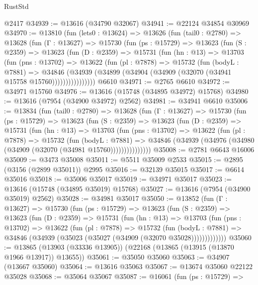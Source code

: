 \begin{lexlean}{RustStd}
\begin{coremodule}
    @2417
@34939 := @13616 (@34790 @32067)
@34941 := @22124 @34854 @30969
@34970 := @13810
    (fun (lets0 : @13624) =>
    @13626
      (fun (tail0 : @2780) =>
      @13628
        (fun (Γ : @13627) =>
        @15730
          (fun (ps : @15729) =>
          @13623
            (fun (S : @2359) =>
            @13623
              (fun (D : @2359) =>
              @15731
                (fun (hn : @13) =>
                @13703
                  (fun (pns : @13702) =>
                  @13622
                    (fun (pl : @7878) =>
                    @15732
                      (fun (bodyL : @7881) =>
                      @34846
                        (@34939
                          (@34899 (@34904 (@34909 (@32070 (@34941 @15758 @15760))))))))))))))))
    @6610
@34971 := @2765 @6610
@34972 := @34971 @15760
@34976 := @13616 (@15748 (@34895 @34972) @15768)
@34980 := @13616 (@7954 (@34900 @34972) @2562)
@34981 := @34941 @6610
@35006 := @13834
    (fun (tail0 : @2780) =>
    @13628
      (fun (Γ : @13627) =>
      @15730
        (fun (ps : @15729) =>
        @13623
          (fun (S : @2359) =>
          @13623
            (fun (D : @2359) =>
            @15731
              (fun (hn : @13) =>
              @13703
                (fun (pns : @13702) =>
                @13622
                  (fun (pl : @7878) =>
                  @15732
                    (fun (bodyL : @7881) =>
                    @34846 (@34939 (@34976 (@34980 (@34909 (@32070 (@34981 @15760)))))))))))))))
@35008 := @2781 @6643 @16006
@35009 := @3473 @35008
@35011 := @5511 @35009 @2533
@35015 := @2895 (@3156 (@2899 @35011)) @2995
@35016 := @32139 @35015
@35017 := @6614 @35016
@35018 := @35006 @35017
@35019 := @34971 @35017
@35023 := @13616 (@15748 (@34895 @35019) @15768)
@35027 := @13616 (@7954 (@34900 @35019) @2562)
@35028 := @34981 @35017
@35050 := @13852
    (fun (Γ : @13627) =>
    @15730
      (fun (ps : @15729) =>
      @13623
        (fun (S : @2359) =>
        @13623
          (fun (D : @2359) =>
          @15731
            (fun (hn : @13) =>
            @13703
              (fun (pns : @13702) =>
              @13622
                (fun (pl : @7878) =>
                @15732
                  (fun (bodyL : @7881) =>
                  @34846 (@34939 (@35023 (@35027 (@34909 (@32070 @35028)))))))))))))
@35060 := @13865 (@13903 (@33336 @13905)) (@22168 (@13865 (@13915 (@13870 @1966 @13917)) @13655))
@35061 := @35050 @35060
@35063 := @34907 (@13667 @35060)
@35064 := @13616 @35063
@35067 := @13674 @35060 @22122 @35028
@35068 := @35064 @35067
@35087 := @16061
    (fun (ps : @15729) =>

\end{coremodule}
\end{lexlean}
